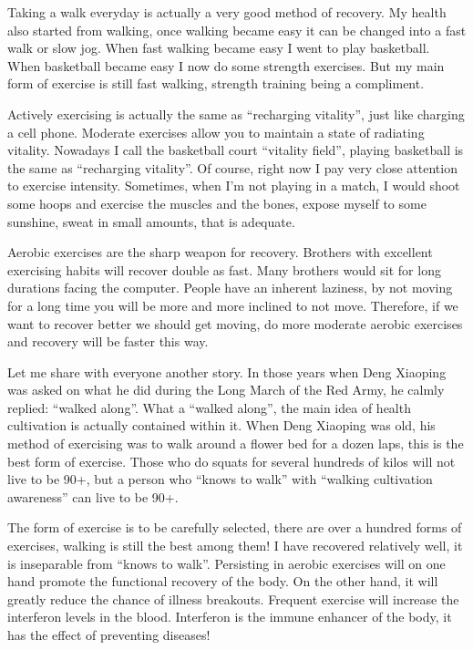 \documentclass[
]{book}
\begin{document}
Taking a walk everyday is actually a very good method of recovery. My health also started from walking, once walking became easy it can be changed into a fast walk or slow jog. When fast walking became easy I went to play basketball. When basketball became easy I now do some strength exercises. But my main form of exercise is still fast walking, strength training being a compliment.

Actively exercising is actually the same as ``recharging vitality'', just like charging a cell phone. Moderate exercises allow you to maintain a state of radiating vitality. Nowadays I call the basketball court ``vitality field'', playing basketball is the same as ``recharging vitality''. Of course, right now I pay very close attention to exercise intensity. Sometimes, when I'm not playing in a match, I would shoot some hoops and exercise the muscles and the bones, expose myself to some sunshine, sweat in small amounts, that is adequate.

Aerobic exercises are the sharp weapon for recovery. Brothers with excellent exercising habits will recover double as fast. Many brothers would sit for long durations facing the computer. People have an inherent laziness, by not moving for a long time you will be more and more inclined to not move. Therefore, if we want to recover better we should get moving, do more moderate aerobic exercises and recovery will be faster this way.

Let me share with everyone another story. In those years when Deng Xiaoping was asked on what he did during the Long March of the Red Army, he calmly replied: ``walked along''. What a ``walked along'', the main idea of health cultivation is actually contained within it. When Deng Xiaoping was old, his method of exercising was to walk around a flower bed for a dozen laps, this is the best form of exercise. Those who do squats for several hundreds of kilos will not live to be 90+, but a person who ``knows to walk'' with ``walking cultivation awareness'' can live to be 90+.

The form of exercise is to be carefully selected, there are over a hundred forms of exercises, walking is still the best among them! I have recovered relatively well, it is inseparable from ``knows to walk''. Persisting in aerobic exercises will on one hand promote the functional recovery of the body. On the other hand, it will greatly reduce the chance of illness breakouts. Frequent exercise will increase the interferon levels in the blood. Interferon is the immune enhancer of the body, it has the effect of preventing diseases!
\end{document}
